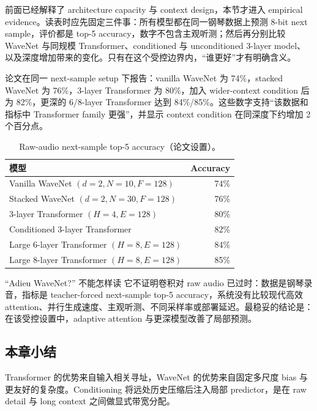 前面已经解释了 architecture capacity 与 context design，本节才进入 empirical evidence。读表时应先固定三件事：所有模型都在同一钢琴数据上预测 8-bit next sample，评价都是 top-5 accuracy，数字不包含主观听测；然后再分别比较 WaveNet 与同规模 Transformer、conditioned 与 unconditioned 3-layer model、以及深度增加带来的变化。只有在这个受控边界内，“谁更好”才有明确含义。

论文在同一 next-sample setup 下报告：vanilla WaveNet 为 74\%，stacked WaveNet 为 76\%，3-layer Transformer 为 80\%，加入 wider-context condition 后为 82\%，更深的 6/8-layer Transformer 达到 84\%/85\%。这些数字支持“该数据和指标中 Transformer family 更强”，并显示 context condition 在同深度下约增加 2 个百分点。


\begin{table}[H]
\centering
\small
\caption{Raw-audio next-sample top-5 accuracy（论文设置）。}
\begin{tabular}{lr}
\toprule
模型 & Accuracy \\
\midrule
Vanilla WaveNet $(d=2,N=10,F=128)$ & 74\% \\
Stacked WaveNet $(d=2,N=30,F=128)$ & 76\% \\
3-layer Transformer $(H=4,E=128)$ & 80\% \\
Conditioned 3-layer Transformer & 82\% \\
Large 6-layer Transformer $(H=8,E=128)$ & 84\% \\
Large 8-layer Transformer $(H=8,E=128)$ & 85\% \\
\bottomrule
\end{tabular}
\end{table}


\begin{warningbox}{“Adieu WaveNet?” 不能怎样读}
它不证明卷积对 raw audio 已过时：数据是钢琴录音，指标是 teacher-forced next-sample top-5 accuracy，系统没有比较现代高效 attention、并行生成速度、主观听测、不同采样率或部署延迟。最稳妥的结论是：在该受控设置中，adaptive attention 与更深模型改善了局部预测。
\end{warningbox}

\subsection{本章小结}

Transformer 的优势来自输入相关寻址，WaveNet 的优势来自固定多尺度 bias 与更友好的复杂度。Conditioning 将远处历史压缩后注入局部 predictor，是在 raw detail 与 long context 之间做显式带宽分配。

